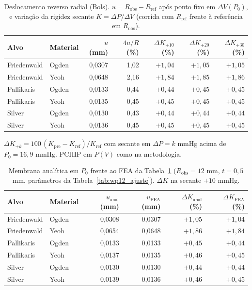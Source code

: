 \begin{table}[h]
\centering
\small
\caption{Deslocamento reverso radial (Bols). $u=R_{\text{obs}}-R_{\text{ref}}$ após ponto fixo em $\Delta V(P_0)$, e variação da rigidez secante $K=\Delta P/\Delta V$ (corrida com $R_{\text{ref}}$ frente à referência em $R_{\text{obs}}$).}
\label{tab:wp13_pretensao}
\begin{tabular}{@{}llrrrrr@{}}
\toprule
Alvo & Material & $u$ (mm) & $4u/R$ (\%) & $\Delta K_{+10}$ (\%) & $\Delta K_{+20}$ (\%) & $\Delta K_{+30}$ (\%) \\
\midrule
Friedenwald & Ogden & 0,0307 & 1,02 & $+1{,}04$ & $+1{,}05$ & $+1{,}05$ \\
Friedenwald & Yeoh  & 0,0648 & 2,16 & $+1{,}84$ & $+1{,}85$ & $+1{,}86$ \\
Pallikaris  & Ogden & 0,0133 & 0,44 & $+0{,}44$ & $+0{,}45$ & $+0{,}45$ \\
Pallikaris  & Yeoh  & 0,0135 & 0,45 & $+0{,}45$ & $+0{,}45$ & $+0{,}45$ \\
Silver      & Ogden & 0,0130 & 0,43 & $+0{,}44$ & $+0{,}44$ & $+0{,}44$ \\
Silver      & Yeoh  & 0,0136 & 0,45 & $+0{,}45$ & $+0{,}45$ & $+0{,}45$ \\
\bottomrule
\end{tabular}

\vspace{2pt}
\footnotesize $\Delta K_{+k}=100\,(K_{\mathrm{pre}}-K_{\mathrm{ref}})/K_{\mathrm{ref}}$ com secante em $\Delta P=k$ mmHg acima de $P_0=16{,}9$ mmHg. PCHIP em $P(V)$ como na metodologia.
\end{table}

\begin{table}[h]
\centering
\small
\caption{Membrana analítica em $P_0$ frente ao FEA da Tabela~\ref{tab:wp13_pretensao} ($R_{\text{obs}}=12$ mm, $t=0{,}5$ mm, parâmetros da Tabela~\ref{tab:wp12_ajuste}). $\Delta K$ na secante $+10$ mmHg.}
\label{tab:wp13_analytic}
\begin{tabular}{@{}llrrrr@{}}
\toprule
Alvo & Material & $u_{\text{anal}}$ (mm) & $u_{\text{FEA}}$ (mm) & $\Delta K_{\text{anal}}$ (\%) & $\Delta K_{\text{FEA}}$ (\%) \\
\midrule
Friedenwald & Ogden & 0,0308 & 0,0307 & $+1{,}05$ & $+1{,}04$ \\
Friedenwald & Yeoh  & 0,0654 & 0,0648 & $+1{,}86$ & $+1{,}84$ \\
Pallikaris  & Ogden & 0,0133 & 0,0133 & $+0{,}45$ & $+0{,}44$ \\
Pallikaris  & Yeoh  & 0,0137 & 0,0135 & $+0{,}46$ & $+0{,}45$ \\
Silver      & Ogden & 0,0130 & 0,0130 & $+0{,}44$ & $+0{,}44$ \\
Silver      & Yeoh  & 0,0139 & 0,0136 & $+0{,}46$ & $+0{,}45$ \\
\bottomrule
\end{tabular}
\end{table}















